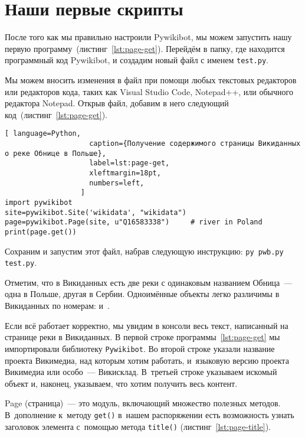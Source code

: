 \section{Наши первые скрипты}

\label{sec:firstScript}
После того как мы правильно настроили Pywikibot, мы можем запустить 
нашу первую программу~(листинг~\ref{lst:page-get}). 
Перейдём в папку, где находится программный код Pywikibot, 
и создадим новый файл с именем \lstinline|test.py|.

Мы можем вносить изменения в файл при помощи любых текстовых редакторов 
или редакторов кода, таких как 
Visual Studio Code, Notepad++, или обычного редактора Notepad. 
Открыв файл, добавим в него следующий код~(листинг~\ref{lst:page-get}).


\begin{lstlisting}[ language=Python,
                    caption={Получение содержимого страницы Викиданных о реке Обнице в Польше},
                    label=lst:page-get,
                    xleftmargin=18pt, 
                    numbers=left,
                  ]
import pywikibot
site=pywikibot.Site('wikidata', "wikidata")
page=pywikibot.Page(site, u"Q16583338")     # river in Poland
print(page.get())
\end{lstlisting}

Сохраним и запустим этот файл, набрав следующую инструкцию: \lstinline|py pwb.py test.py|.

Отметим, что в Викиданных есть две реки с одинаковым названием Обница~--- 
одна в Польше, другая в Сербии. Одноимённые объекты легко различимы в Викиданных
по номерам:  и~.

Если всё работает корректно, мы увидим в консоли весь текст, 
написанный на странице реки  в Викиданных. 
В первой строке программы~\ref{lst:page-get} мы импортировали библиотеку \lstinline|Pywikibot|. 
Во второй строке указали название проекта Викимедиа, над которым хотим работать, 
и~языковую версию проекта Викимедиа или особо~--- Викисклад. 
%
В~третьей строке указываем искомый объект и, наконец, указываем, что хотим получить весь контент.


Page (страница)~--- это модуль, включающий множество полезных методов.\,  В~дополнение к~методу \lstinline|get()| в~нашем распоряжении есть возможность 
узнать заголовок элемента с~помощью метода \lstinline|title()| (листинг~\ref{lst:page-title}).

